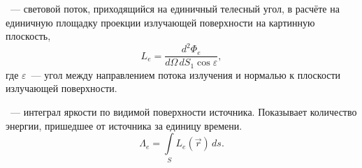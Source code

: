~--- световой поток, приходящийся на единичный телесный угол, в расчёте на единичную площадку проекции излучающей поверхности на картинную плоскость,
\begin{equation}
    L_e = \frac{d^2 \Phi_e}{d \Omega \,d S_1 \cos \varepsilon},
\end{equation}
где $\varepsilon$~--- угол между направлением потока излучения и нормалью к плоскости излучающей поверхности.

~--- интеграл яркости по видимой поверхности источника. Показывает количество энергии, пришедшее от источника за единицу времени.
\begin{equation}
    \Lambda_e = \int \limits_S L_e(\vec{r}) \,d s.
\end{equation}

